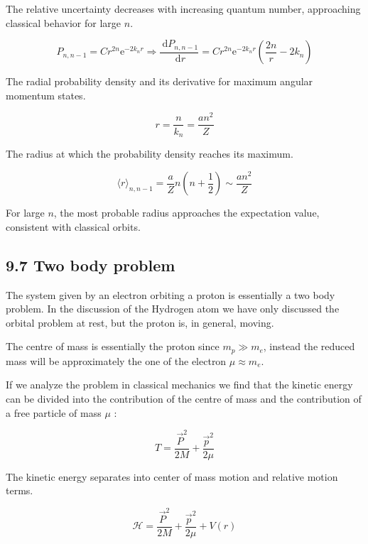\documentclass[10pt]{article}
\begin{document}
The relative uncertainty decreases with increasing quantum number, approaching classical behavior for large $n$.

\begin{equation*}
P_{n, n-1}=C r^{2 n} \mathrm{e}^{-2 k_{n} r} \Longrightarrow \frac{\mathrm{~d} P_{n, n-1}}{\mathrm{~d} r}=C r^{2 n} \mathrm{e}^{-2 k_{n} r}\left(\frac{2 n}{r}-2 k_{n}\right) \tag{9.105}
\end{equation*}

The radial probability density and its derivative for maximum angular momentum states.

\begin{equation*}
r=\frac{n}{k_{n}}=\frac{a n^{2}}{Z} \tag{9.106}
\end{equation*}

The radius at which the probability density reaches its maximum.

\begin{equation*}
\langle r\rangle_{n, n-1}=\frac{a}{Z} n\left(n+\frac{1}{2}\right) \sim \frac{a n^{2}}{Z} \tag{9.107}
\end{equation*}

For large $n$, the most probable radius approaches the expectation value, consistent with classical orbits.

\subsection*{9.7 Two body problem}
The system given by an electron orbiting a proton is essentially a two body problem. In the discussion of the Hydrogen atom we have only discussed the orbital problem at rest, but the proton is, in general, moving.

The centre of mass is essentially the proton since $m_{p} \gg m_{e}$, instead the reduced mass will be approximately the one of the electron $\mu \approx m_{e}$.

If we analyze the problem in classical mechanics we find that the kinetic energy can be divided into the contribution of the centre of mass and the contribution of a free particle of mass $\mu$ :

\begin{equation*}
T=\frac{\vec{P}^{2}}{2 M}+\frac{\vec{p}^{2}}{2 \mu} \tag{9.108}
\end{equation*}

The kinetic energy separates into center of mass motion and relative motion terms.

\begin{equation*}
\mathcal{H}=\frac{\vec{P}^{2}}{2 M}+\frac{\vec{p}^{2}}{2 \mu}+V(r) \tag{9.109}
\end{equation*}
\end{document}
